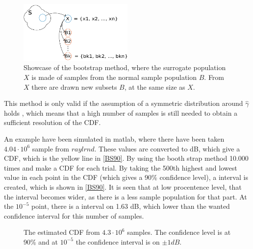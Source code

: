 \begin{figure}[H]
\centering
\includegraphics[width=0.5\textwidth]{figures/Bootstrap.pdf}
\caption{Showcase of the bootstrap method, where the surrogate population $X$ is made of samples from the normal sample population $B$. From $X$ there are drawn new subsets $B$, at the same size as $X$.}
\label{BSEX}
\end{figure}

This method is only valid if the assumption of a symmetric distribution around $\hat{\gamma}$ holds \citep{Bootstrap}, which means that a high number of samples is still needed to obtain a sufficient resolution of the CDF. 

An example have been simulated in matlab, where there have been taken $4.04 \cdot 10^6$ sample from $raylrnd$. These values are converted to dB, which give a CDF, which is the yellow line in \autoref{BS90}. By using the booth strap method 10.000 times and make a CDF for each trial. By taking the 500th highest and lowest value in each point in the CDF (which gives a 90\% confidence level), a interval is created, which is shown in \autoref{BS90}. It is seen that at low procentence level, that the interval becomes wider, as there is a less sample population for that part. At the $10^{-5}$ point, there is a interval on 1.63 dB, which lower than the wanted confidence interval for this number of samples. 

\begin{figure}[H]
\center

\caption{The estimated CDF from $4.3 \cdot 10^6$ samples. The confidence level is at 90\% and at $10^{-5}$ the confidence interval is on $\pm 1dB$.}
\label{BS90}
\end{figure}




